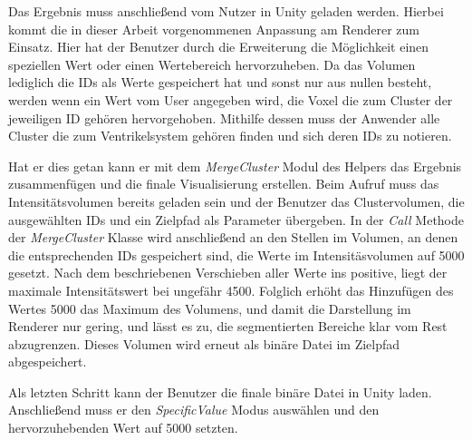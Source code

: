 Das Ergebnis muss anschließend vom Nutzer in Unity geladen werden. Hierbei kommt die in dieser Arbeit vorgenommenen Anpassung am Renderer zum Einsatz.
Hier hat der Benutzer durch die Erweiterung die Möglichkeit einen speziellen Wert oder einen Wertebereich hervorzuheben. Da das Volumen lediglich die IDs als Werte gespeichert hat und sonst nur aus nullen besteht, werden wenn ein Wert vom User angegeben wird, die Voxel die zum Cluster der jeweiligen ID gehören hervorgehoben.
Mithilfe dessen muss der Anwender alle Cluster die zum Ventrikelsystem gehören finden und sich deren IDs zu notieren.


Hat er dies getan kann er mit dem \textit{MergeCluster} Modul des Helpers das Ergebnis zusammenfügen und die finale Visualisierung erstellen. Beim Aufruf muss das Intensitätsvolumen bereits geladen sein und der Benutzer das Clustervolumen, die ausgewählten IDs und ein Zielpfad als Parameter übergeben. In der \textit{Call} Methode der \textit{MergeCluster} Klasse wird anschließend an den Stellen im Volumen, an denen die entsprechenden IDs gespeichert sind, die Werte im Intensitäsvolumen auf 5000 gesetzt.
Nach dem beschriebenen Verschieben aller Werte ins positive, liegt der maximale Intensitätswert bei ungefähr 4500. Folglich erhöht das Hinzufügen des Wertes 5000 das Maximum des Volumens, und damit die Darstellung im Renderer nur gering, und lässt es zu, die segmentierten Bereiche klar vom Rest abzugrenzen. Dieses Volumen wird erneut als binäre Datei im Zielpfad abgespeichert.


Als letzten Schritt kann der Benutzer die finale binäre Datei in Unity laden. Anschließend muss er den \textit{SpecificValue} Modus auswählen und den hervorzuhebenden Wert auf 5000 setzten.













































